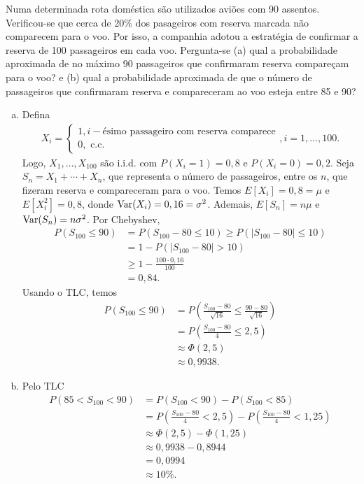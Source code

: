\documentclass[../Notas.tex]{subfiles}
\begin{document}
\begin{example}
    Numa determinada rota doméstica são utilizados aviões com 90 assentos. Verificou-se que cerca de 20\% dos pasageiros com reserva marcada não comparecem para o voo. Por isso, a companhia adotou a estratégia de confirmar a reserva de 100 passageiros em cada voo. Pergunta-se (a) qual a probabilidade aproximada de no máximo 90 passageiros que confirmaram reserva compareçam para o voo? e (b) qual a probabilidade aproximada de que o número de passageiros que confirmaram reserva e compareceram ao voo esteja entre 85 e 90?
    \begin{enumerate}[(a)]
        \item Defina
        \begin{align*}
            X_i = \begin{cases}
                  1, i-\text{ésimo passageiro com reserva comparece} \\
                  0, \text{ c.c.}
            \end{cases}, i = 1, \dots, 100.
        \end{align*}
        Logo, $X_1, \dots, X_{100}$ são i.i.d. com $P(X_i = 1) = 0,8$ e $P(X_i = 0) = 0,2$. Seja $S_n = X_1 + \cdots + X_n$, que representa o número de passageiros, entre os $n$, que fizeram reserva e compareceram para o voo. Temos $E[X_i] = 0,8 = \mu$ e $E[X_i^2] = 0,8$, donde $\text{Var}(X_i) = 0,16 = \sigma^2$. Ademais, $E[S_n] = n\mu$ e $\text{Var}(S_n) = n\sigma^2$. Por Chebyshev,
        \begin{align*}
            P(S_{100}\leq 90) &= P(S_{100} - 80 \leq 10) \geq P(|S_{100} - 80|\leq 10) \\
            &= 1 - P(|S_{100} - 80| > 10) \\
            &\geq 1 - \frac{100\cdot 0,16}{100} \\
            &= 0,84.
        \end{align*}
        Usando o TLC, temos
        \begin{align*}
            P(S_{100} \leq 90) &= P\left( \frac{S_{100} - 80}{\sqrt{16}} \leq \frac{90 - 80}{\sqrt{16}} \right) \\
            &= P\left( \frac{S_{100} - 80}{4} \leq 2,5 \right) \\
            &\approx \Phi(2,5) \\
            &\approx 0,9938.
        \end{align*}
        \item Pelo TLC
        \begin{align*}
            P(85 < S_{100} < 90) &= P(S_{100} < 90) - P(S_{100} < 85) \\
            &= P\left( \frac{S_{100} - 80}{4} < 2,5 \right) - P\left( \frac{S_{100} - 80}{4} < 1,25 \right) \\ 
            &\approx \Phi(2,5) - \Phi(1,25) \\
            &\approx 0,9938 - 0,8944 \\
            &= 0,0994 \\
            &\approx 10\%.
        \end{align*}
    \end{enumerate}
\end{example}
\end{document}
